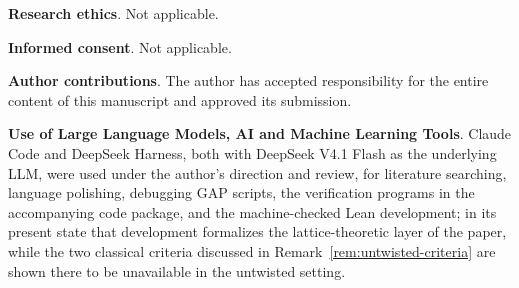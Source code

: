\documentclass[12pt,a4paper]{article}
\theoremstyle{definition}
\begin{document}
\medskip\noindent
\textbf{Research ethics}. Not applicable.

\medskip\noindent
\textbf{Informed consent}. Not applicable. 

\medskip\noindent
\textbf{Author contributions}. The author has accepted responsibility for the
entire content of this manuscript and approved its submission.

\medskip\noindent
\textbf{Use of Large Language Models, AI and Machine Learning Tools}.
Claude Code and DeepSeek Harness, both with DeepSeek V4.1 Flash as the
underlying LLM, were used under the author's direction and review, for
literature searching, language polishing, debugging GAP scripts, the
verification programs in the accompanying code package, and the
machine-checked Lean development; in its present state that development
formalizes the lattice-theoretic layer of the paper, while the two
classical criteria discussed in Remark~\ref{rem:untwisted-criteria} are
shown there to be unavailable in the untwisted setting.
\end{document}
